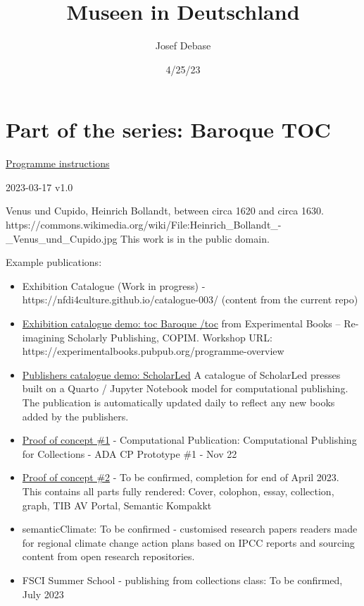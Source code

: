 \documentclass[
  letterpaper,
]{book}
\title{Museen in Deutschland}
\author{Josef Debase}
\date{4/25/23}
\renewcommand*\contentsname{Table of contents}
\newcommand\contentsname{Table of contents}
\begin{document}
\frontmatter
\maketitle
\ifdefined\Shaded\renewenvironment{Shaded}{\begin{tcolorbox}[borderline west={3pt}{0pt}{shadecolor}, enhanced, breakable, interior hidden, boxrule=0pt, sharp corners, frame hidden]}{\end{tcolorbox}}\fi

\renewcommand*\contentsname{Table of contents}
{
\setcounter{tocdepth}{2}
\tableofcontents
}
\mainmatter
{}

\hypertarget{part-of-the-series-baroque-toc}{%
\chapter{Part of the series: Baroque
TOC}\label{part-of-the-series-baroque-toc}}

\href{https://nfdi4culture.github.io/class-ADA-CP-pipeline/}{Programme
instructions}

2023-03-17 v1.0

Venus und Cupido, Heinrich Bollandt, between circa 1620 and circa 1630.
https://commons.wikimedia.org/wiki/File:Heinrich\_Bollandt\_-\_Venus\_und\_Cupido.jpg
This work is in the public domain.

Example publications:

\begin{itemize}
\item
  Exhibition Catalogue (Work in progress) -
  https://nfdi4culture.github.io/catalogue-003/ (content from the
  current repo)
\item
  \href{https://nfdi4culture.github.io/experimental-books-workshop/}{Exhibition
  catalogue demo: toc Baroque /toc} from Experimental Books --
  Re-imagining Scholarly Publishing, COPIM. Workshop URL:
  https://experimentalbooks.pubpub.org/programme-overview
\item
  \href{https://simonxix.github.io/scholarled_catalogue/}{Publishers
  catalogue demo: ScholarLed} A catalogue of ScholarLed presses built on
  a Quarto / Jupyter Notebook model for computational publishing. The
  publication is automatically updated daily to reflect any new books
  added by the publishers.
\item
  \href{https://nfdi4culture.github.io/cp4c/}{Proof of concept \#1} -
  Computational Publication: Computational Publishing for Collections -
  ADA CP Prototype \#1 - Nov 22
\item
  \href{https://nfdi4culture.github.io/art_catalogue_test/}{Proof of
  concept \#2} - To be confirmed, completion for end of April 2023. This
  contains all parts fully rendered: Cover, colophon, essay, collection,
  graph, TIB AV Portal, Semantic Kompakkt
\item
  semanticClimate: To be confirmed - customised research papers readers
  made for regional climate change action plans based on IPCC reports
  and sourcing content from open research repositories.
\item
  FSCI Summer School - publishing from collections class: To be
  confirmed, July 2023
\end{itemize}
\end{document}
